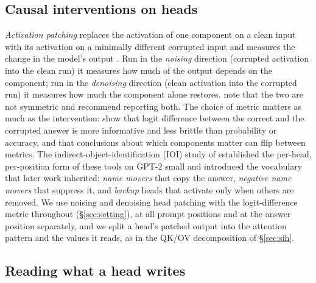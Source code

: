\subsection{Causal interventions on heads}
\label{sec:rw-patching}

\emph{Activation patching} replaces the activation of one component on a clean input
with its activation on a minimally different corrupted input and measures the change
in the model's output \citep{wang2023ioi,heimersheim2024patching}. Run in the
\emph{noising} direction (corrupted activation into the clean run) it measures how
much of the output depends on the component; run in the \emph{denoising} direction
(clean activation into the corrupted run) it measures how much the component alone
restores. \citet{heimersheim2024patching} note that the two are not symmetric and
recommend reporting both. The choice of metric matters as much as the intervention:
\citet{zhang2024bestpractices} show that logit difference between the correct and the
corrupted answer is more informative and less brittle than probability or accuracy,
and that conclusions about which components matter can flip between metrics. The
indirect-object-identification (IOI) study of \citet{wang2023ioi} established the
per-head, per-position form of these tools on GPT-2 small and introduced the
vocabulary that later work inherited: \emph{name movers} that copy the answer,
\emph{negative name movers} that suppress it, and \emph{backup} heads that activate
only when others are removed. We use noising and denoising head patching with the
logit-difference metric throughout (\S\ref{sec:setting}), at all prompt positions and
at the answer position separately, and we split a head's patched output into the
attention pattern and the values it reads, as in the QK/OV decomposition of
\S\ref{sec:sih}.

\subsection{Reading what a head writes}
\label{sec:rw-readout}


